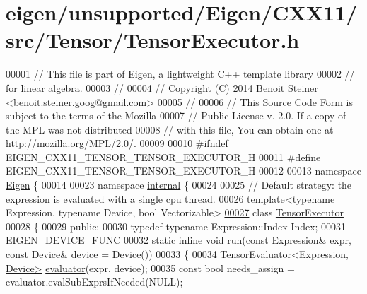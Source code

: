 \hypertarget{eigen_2unsupported_2_eigen_2_c_x_x11_2src_2_tensor_2_tensor_executor_8h_source}{}\section{eigen/unsupported/\+Eigen/\+C\+X\+X11/src/\+Tensor/\+Tensor\+Executor.h}
\label{eigen_2unsupported_2_eigen_2_c_x_x11_2src_2_tensor_2_tensor_executor_8h_source}

\begin{DoxyCode}
00001 \textcolor{comment}{// This file is part of Eigen, a lightweight C++ template library}
00002 \textcolor{comment}{// for linear algebra.}
00003 \textcolor{comment}{//}
00004 \textcolor{comment}{// Copyright (C) 2014 Benoit Steiner <benoit.steiner.goog@gmail.com>}
00005 \textcolor{comment}{//}
00006 \textcolor{comment}{// This Source Code Form is subject to the terms of the Mozilla}
00007 \textcolor{comment}{// Public License v. 2.0. If a copy of the MPL was not distributed}
00008 \textcolor{comment}{// with this file, You can obtain one at http://mozilla.org/MPL/2.0/.}
00009 
00010 \textcolor{preprocessor}{#ifndef EIGEN\_CXX11\_TENSOR\_TENSOR\_EXECUTOR\_H}
00011 \textcolor{preprocessor}{#define EIGEN\_CXX11\_TENSOR\_TENSOR\_EXECUTOR\_H}
00012 
00013 \textcolor{keyword}{namespace }\hyperlink{namespace_eigen}{Eigen} \{
00014 
00023 \textcolor{keyword}{namespace }\hyperlink{namespaceinternal}{internal} \{
00024 
00025 \textcolor{comment}{// Default strategy: the expression is evaluated with a single cpu thread.}
00026 \textcolor{keyword}{template}<\textcolor{keyword}{typename} Expression, \textcolor{keyword}{typename} Device, \textcolor{keywordtype}{bool} Vectorizable>
\hyperlink{class_eigen_1_1internal_1_1_tensor_executor}{00027} \textcolor{keyword}{class }\hyperlink{class_eigen_1_1internal_1_1_tensor_executor}{TensorExecutor}
00028 \{
00029  \textcolor{keyword}{public}:
00030   \textcolor{keyword}{typedef} \textcolor{keyword}{typename} Expression::Index Index;
00031   EIGEN\_DEVICE\_FUNC
00032   \textcolor{keyword}{static} \textcolor{keyword}{inline} \textcolor{keywordtype}{void} run(\textcolor{keyword}{const} Expression& expr, \textcolor{keyword}{const} Device& device = Device())
00033   \{
00034     \hyperlink{struct_eigen_1_1_tensor_evaluator}{TensorEvaluator<Expression, Device>} 
      \hyperlink{struct_eigen_1_1internal_1_1evaluator}{evaluator}(expr, device);
00035     \textcolor{keyword}{const} \textcolor{keywordtype}{bool} needs\_assign = evaluator.evalSubExprsIfNeeded(NULL);

\end{DoxyCode}
